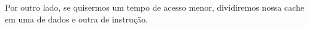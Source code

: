 \documentclass[12pt,a4paper]{article}
\begin{document}
Por outro lado, se quisermos um tempo de acesso menor, dividiremos nossa cache
em uma de dados e outra de instrução.


\begin{small}
  
\end{small}
\end{document}
